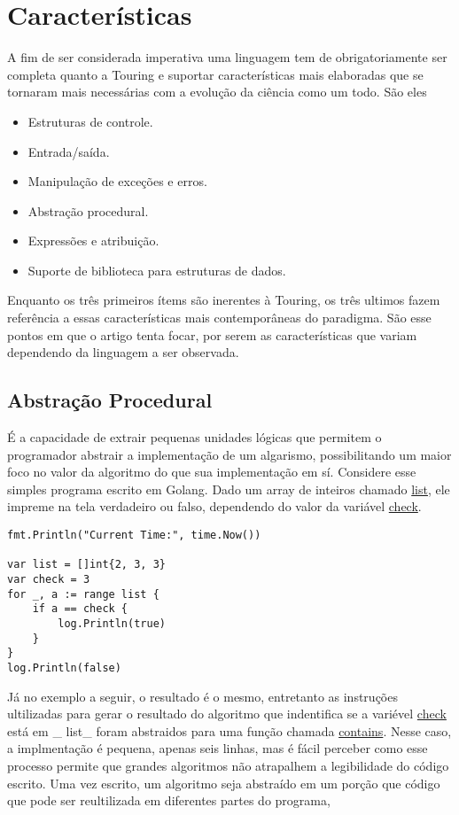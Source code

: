 \documentclass[11pt]{article}
\begin{document}
\section{Características}
\label{sec:org9a7fb94}

A fim de ser considerada imperativa uma linguagem tem de obrigatoriamente ser completa quanto a Touring e suportar características mais elaboradas que se tornaram mais necessárias com a evolução da ciência como um todo. São eles

\begin{itemize}
\item Estruturas de controle.
\item Entrada/saída.
\item Manipulação de exceções e erros.
\item Abstração procedural.
\item Expressões e atribuição.
\item Suporte de biblioteca para estruturas de dados.
\end{itemize}

Enquanto os três primeiros ítems são inerentes à Touring, os três ultimos fazem referência a essas características mais contemporâneas do paradigma. São esse pontos em que o artigo tenta focar, por serem as características que variam dependendo da linguagem a ser observada.

\subsection{Abstração Procedural}
\label{sec:org0e25a6e}
É a capacidade de extrair pequenas unidades lógicas que permitem o programador abstrair a implementação de um algarismo, possibilitando um maior foco no valor da algoritmo do que sua implementação em sí. Considere esse simples programa escrito em Golang. Dado um array de inteiros chamado \uline{list}, ele impreme na tela verdadeiro ou falso, dependendo do valor da variável \uline{check}.
\begin{verbatim}
fmt.Println("Current Time:", time.Now())

var list = []int{2, 3, 3}
var check = 3
for _, a := range list {
	if a == check {
		log.Println(true)
	}
}
log.Println(false)
\end{verbatim}

Já no exemplo a seguir, o resultado é o mesmo, entretanto as instruções ultilizadas para gerar o resultado do algoritmo que indentifica se a variével \uline{check} está em \_ list\_ foram abstraidos para uma função chamada \uline{contains}. Nesse caso, a implmentação é pequena, apenas seis linhas, mas é fácil perceber como esse processo permite que grandes algoritmos não atrapalhem a legibilidade do código escrito. Uma vez escrito, um algoritmo seja abstraído em um porção que código que pode ser reultilizada em diferentes partes do programa,
\end{document}
